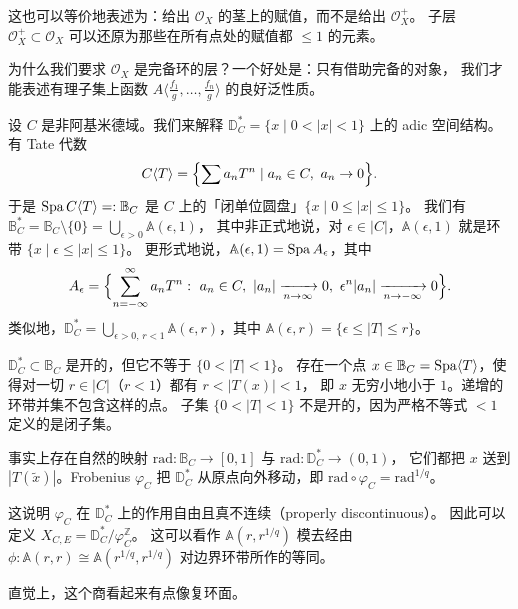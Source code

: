 \begin{remark}
这也可以等价地表述为：给出 $\mathcal{O}_X$ 的茎上的赋值，而不是给出 $\mathcal{O}^+_X$。
子层 $\mathcal{O}^+_X\subset\mathcal{O}_X$ 可以还原为那些在所有点处的赋值都 $\le1$ 的元素。
\end{remark}

\begin{remark}
为什么我们要求 $\mathcal{O}_X$ 是完备环的层？一个好处是：只有借助完备的对象，
我们才能表述有理子集上函数 $A\langle\frac{f_1}{g},\dots,\frac{f_n}{g}\rangle$ 的良好泛性质。
\end{remark}

\begin{example}
设 $C$ 是非阿基米德域。我们来解释 $\mathbb{D}^*_C=\{x\mid0<|x|<1\}$ 上的 adic 空间结构。有 Tate 代数
\[
C\langle T\rangle=\Bigl\{\sum a_nT^n \mid a_n\in C,\ a_n\to0\Bigr\}.
\]
于是 $\operatorname{Spa} C\langle T\rangle=:\mathbb{B}_C$ 是 $C$ 上的「闭单位圆盘」$\{x\mid0\le|x|\le1\}$。
我们有 $\mathbb{B}^*_C=\mathbb{B}_C\setminus\{0\}=\bigcup_{\epsilon>0}\mathbb{A}(\epsilon,1)$，
其中非正式地说，对 $\epsilon\in|C|$，$\mathbb{A}(\epsilon,1)$ 就是环带 $\{x\mid\epsilon\le|x|\le1\}$。
更形式地说，$\mathbb{A}(\epsilon,1)=\operatorname{Spa} A_\epsilon$，其中
\[
A_\epsilon=\Bigl\{\sum_{n=-\infty}^{\infty}a_nT^n:\ a_n\in C,\
|a_n|\xrightarrow[n\to\infty]{}0,\ \epsilon^n|a_n|\xrightarrow[n\to-\infty]{}0\Bigr\}.
\]
类似地，$\mathbb{D}^*_C=\bigcup_{\epsilon>0,\,r<1}\mathbb{A}(\epsilon,r)$，其中
$\mathbb{A}(\epsilon,r)=\{\epsilon\le|T|\le r\}$。
\end{example}

\begin{warning}
$\mathbb{D}^*_C\subset\mathbb{B}_C$ 是开的，但它不等于 $\{0<|T|<1\}$。
存在一个点 $x\in\mathbb{B}_C=\operatorname{Spa}\langle T\rangle$，使得对一切 $r\in|C|$（$r<1$）都有 $r<|T(x)|<1$，
即 $x$ 无穷小地小于 $1$。递增的环带并集不包含这样的点。
子集 $\{0<|T|<1\}$ 不是开的，因为严格不等式 $<1$ 定义的是闭子集。
\end{warning}

\begin{center}
\end{center}
\begin{center}
\end{center}

事实上存在自然的映射 $\mathrm{rad}:\mathbb{B}_C\to[0,1]$ 与 $\mathrm{rad}:\mathbb{D}^*_C\to(0,1)$，
它们都把 $x$ 送到 $|T(\tilde x)|$。Frobenius $\varphi_C$ 把 $\mathbb{D}^*_C$ 从原点向外移动，即
$\mathrm{rad}\circ\varphi_C=\mathrm{rad}^{1/q}$。

这说明 $\varphi_C$ 在 $\mathbb{D}^*_C$ 上的作用自由且真不连续（properly discontinuous）。
因此可以定义 $X_{C,E}=\mathbb{D}^*_C/\varphi_C^{\mathbb{Z}}$。
这可以看作 $\mathbb{A}(r,r^{1/q})$ 模去经由 $\phi:\mathbb{A}(r,r)\cong\mathbb{A}(r^{1/q},r^{1/q})$
对边界环带所作的等同。

直觉上，这个商看起来有点像复环面。
